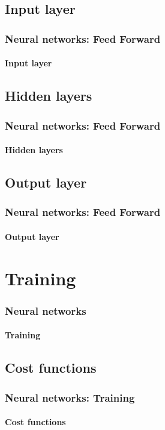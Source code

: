 \documentclass[xcolor=table]{beamer}
\begin{document}
\subsection{Input layer}

\begin{frame}
	\frametitle{Neural networks: Feed Forward}
	\framesubtitle{Input layer}
	
\end{frame}

\subsection{Hidden layers}

\begin{frame}
	\frametitle{Neural networks: Feed Forward}
	\framesubtitle{Hidden layers}
	
\end{frame}

\subsection{Output layer}

\begin{frame}
	\frametitle{Neural networks: Feed Forward}
	\framesubtitle{Output layer}
	
\end{frame}


\section{Training}

\begin{frame}
	\frametitle{Neural networks}
	\framesubtitle{Training}
	
\end{frame}

\subsection{Cost functions}

\begin{frame}
	\frametitle{Neural networks: Training}
	\framesubtitle{Cost functions}
	
\end{frame}
\end{document}
